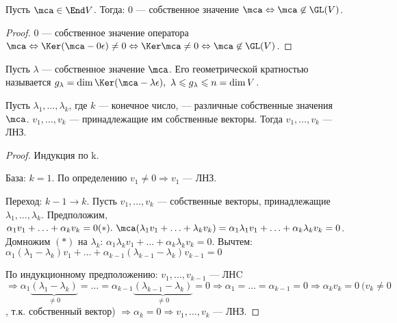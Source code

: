 \documentclass[main]{subfiles}
\begin{document}
\begin{lemma}
    Пусть $\mca \in \End V$. Тогда: 0 — собственное значение $\mca
        \Leftrightarrow \mca \not\in \GL(V)$.
\end{lemma}

\begin{proof}
    0 — собственное значение оператора $\mca \Leftrightarrow
        \Ker (\mca - 0\epsilon) \neq 0 \Leftrightarrow
        \Ker \mca \neq 0 \Leftrightarrow \mca \not\in \GL(V)$.
\end{proof}

\begin{definition}
    Пусть $\lambda$ — собственное значение $\mca$.
    Его геометрической кратностью называется
    $g_\lambda = \dim \Ker (\mca -\lambda\epsilon),\ \lambda \leqslant g_\lambda \leqslant n = \dim V$.
\end{definition}

\begin{proposition}
    Пусть $\lambda_1, \ldots, \lambda_k$, где $k$ — конечное число, — различные собственные значения $\mca$.
    $v_1, \ldots, v_k$ — принадлежащие им собственные векторы.
    Тогда  $v_1, \ldots, v_k$ — ЛНЗ.
\end{proposition}

\begin{proof}
    Индукция по k.

    База: $k = 1$.  По определению $v_1 \neq 0 \Rightarrow v_1$ — ЛНЗ.

    Переход: $k-1 \rightarrow k$. Пусть $v_1, \ldots, v_k$  — собственные
    векторы, принадлежащие $\lambda_1, \ldots, \lambda_k$.
    Предположим, $\alpha_1 v_1 + \ldots + \alpha_k v_k = 0 (*).\
        \mca(\lambda_1 v_1 + \ldots + \lambda_k v_k) =
        \alpha_1 \lambda_1 v_1 + \ldots + \alpha_k \lambda_k v_k = 0$.  Домножим $(*)$ на $\lambda_k$:
    $\alpha_1 \lambda_k v_1 + \ldots + \alpha_k \lambda_k v_k = 0$.
    Вычтем: $\alpha_1(\lambda_1 - \lambda_k)v_1 + \ldots + \alpha_{k-1}(\lambda_{k-1} - \lambda_k)v_{k-1} = 0$

    По индукционному предположению: $v_1, \ldots, v_{k-1}$ — ЛНC
    $\Rightarrow \alpha_1\underbrace{(\lambda_1 - \lambda_k)}_{\neq 0} = \ldots =
        \alpha_{k-1}\underbrace{(\lambda_{k-1} - \lambda_k)}_{\neq 0} = 0 \Rightarrow
        \alpha_1 = \ldots = \alpha_{k-1} = 0 \Rightarrow \alpha_k v_k = 0\ (v_k \neq 0$, т.к. собственный вектор) $\Rightarrow \alpha_k = 0 \Rightarrow
        v_1, \ldots, v_k$ — ЛНЗ.
\end{proof}
\end{document}
